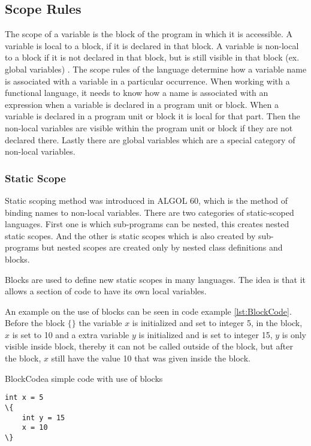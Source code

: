 \subsection{Scope Rules}
\label{sec:scoperules}
The scope of a variable is the block of the program in which it is accessible. A variable is local to a block, if it is declared in that block. A variable is non-local to a block if it is not declared in that block, but is still visible in that block (ex. global variables) \citep{sebesta}.
The scope rules of the language determine how a variable name is associated with a variable in a particular occurrence. When working with a functional language, it needs to know how a name is associated with an expression when a variable is declared in a program unit or block. When a variable is declared in a program unit or block it is local for that part. Then the non-local variables are visible within the program unit or block if they are not declared there. Lastly there are global variables which are a special category of non-local variables.

\subsubsection{Static Scope}
Static scoping method was introduced in ALGOL 60, which is the method of binding names to non-local variables. There are two categories of static-scoped languages. First one is which sub-programs can be nested, this creates nested static scopes. And the other is static scopes which is also created by sub-programs but nested scopes are created only by nested class definitions and blocks.

Blocks are used to define new static scopes in many languages. The idea is that it allows a section of code to have its own local variables.

An example on the use of blocks can be seen in code example \ref{lst:BlockCode}. Before the block $\{ \}$ the variable $x$ is initialized and set to integer 5, in the block, $x$ is set to 10 and a extra variable $y$ is initialized and is set to integer 15, $y$ is only visible inside block, thereby it can not be called outside of the block, but after the block, $x$ still have the value 10 that was given inside the block.

\begin{code}{BlockCode}{a simple code with use of blocks}
\begin{lstlisting}
int x = 5
\{
    int y = 15
    x = 10
\} 
\end{lstlisting}
\end{code}

